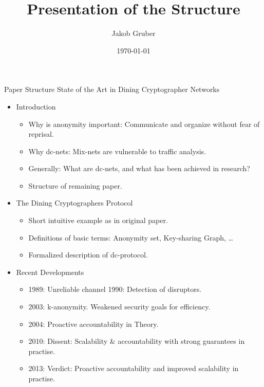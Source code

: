 \documentclass[]{beamer}
\title{Presentation of the Structure}
\author{Jakob Gruber}
\date{\today}
\begin{document}
\maketitle

\begin{frame}[allowframebreaks]{Paper Structure}
    State of the Art in Dining Cryptographer Networks
    \begin{itemize}
    \item Introduction

        \begin{itemize}
        \item Why is anonymity important: Communicate and organize without fear of reprisal.
        \item Why dc-nets: Mix-nets are vulnerable to traffic analysis.
        \item Generally: What are dc-nets, and what has been achieved in research?
        \item Structure of remaining paper.
        \end{itemize}

    \item The Dining Cryptographers Protocol
    
        \begin{itemize}
        \item Short intuitive example as in original paper.
        \item Definitions of basic terms: Anonymity set, Key-sharing Graph, \ldots
        \item Formalized description of dc-protocol.
        \end{itemize}
    
    \item Recent Developments
    
        \begin{itemize}
        \item 1989: Unreliable channel 1990: Detection of disruptors.
        \item 2003: k-anonymity. Weakened security goals for efficiency.
        \item 2004: Proactive accountability in Theory.
        \item 2010: Dissent: Scalability \& accountability with strong guarantees in practise.
        \item 2013: Verdict: Proactive accountability and improved scalability in practise.
        \end{itemize}


\end{itemize}
\end{frame}
\end{document}

